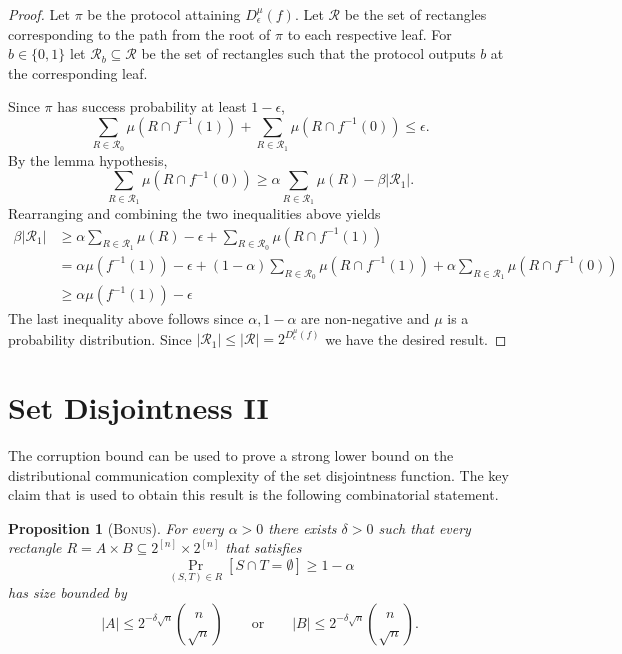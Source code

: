 \documentclass[11pt]{amsart}
\theoremstyle{plain}
\newtheorem{proposition}{Proposition}
\theoremstyle{definition}
\theoremstyle{plain}
\begin{document}
\begin{proof}
Let $\pi$ be the protocol attaining $D_\epsilon^{\mu}(f)$.
Let $\mathcal{R}$ be the set of rectangles corresponding to the path from the root of $\pi$ to each respective leaf. For $b \in \{0,1\}$ let $\mathcal{R}_b \subseteq \mathcal{R}$ be the set of rectangles such that the protocol outputs $b$ at the corresponding leaf.

Since $\pi$ has success probability at least $1-\epsilon$,
$$\sum_{R \in \mathcal{R}_0} \mu(R\cap f^{-1}(1)) + \sum_{R \in \mathcal{R}_1} \mu(R\cap f^{-1}(0)) \leq \epsilon.$$
By the lemma hypothesis,
$$\sum_{R \in \mathcal{R}_1}\mu(R\cap f^{-1}(0)) \geq \alpha\sum_{R \in \mathcal{R}_1}\mu(R) -\beta\left|\mathcal{R}_1\right|.$$
Rearranging and combining the two inequalities above yields
\begin{align*}
    \beta|\mathcal{R}_1| &\geq \alpha\sum_{R \in \mathcal{R}_1}\mu(R) - \epsilon + \sum_{R \in \mathcal{R}_0}\mu(R\cap f^{-1}(1))\\
    &=\alpha \mu(f^{-1}(1)) - \epsilon + (1-\alpha)\sum_{R \in \mathcal{R}_0}\mu(R\cap f^{-1}(1))+\alpha \sum_{R \in \mathcal{R}_1}\mu(R\cap f^{-1}(0))\\
    &\geq \alpha \mu(f^{-1}(1)) - \epsilon
\end{align*}
The last inequality above follows since $\alpha, 1-\alpha$ are non-negative and $\mu$ is a probability distribution. Since $|\mathcal{R}_1| \leq |\mathcal{R}| = 2^{D^\mu_\epsilon(f)}$ we have the desired result.
\end{proof}



\newpage \section{Set Disjointness II}

The corruption bound can be used to prove a strong lower bound on the distributional communication complexity of the set disjointness function. The key claim that is used to obtain this result is the following combinatorial statement.

\begin{proposition}[\textsc{Bonus}]
For every $\alpha >0$ there exists $\delta>0$ such that every rectangle $R = A \times B \subseteq 2^{[n]} \times 2^{[n]}$
that satisfies 
\[
\Pr_{(S,T) \in R}[ S \cap T = \emptyset ] \ge 1-\alpha
\]
has size bounded by
\[
|A| \le 2^{-\delta \sqrt{n}} \binom{n}{\sqrt{n}}
\qquad \mbox{or} \qquad
|B| \le 2^{-\delta \sqrt{n}} \binom{n}{\sqrt{n}}.
\]
\end{proposition}
\end{document}
